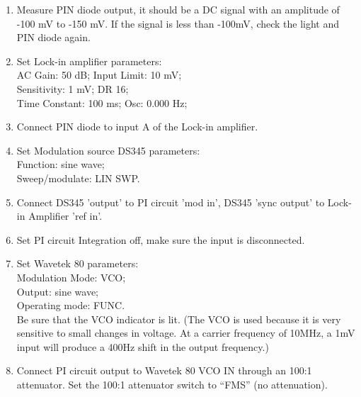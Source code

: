 {\begin{enumerate}
\item Measure PIN diode output, it should be a DC signal with an amplitude
of -100 mV to -150 mV.  If the signal is less than -100mV, check the light and 
PIN diode again.

\item Set Lock-in amplifier parameters:\\
\indent    AC Gain:     50 dB;    \hspace{3.2cm}    Input Limit: 10 mV;\\
\indent    Sensitivity:  1 mV;    \hspace{3cm}    DR 16;\\
\indent    Time Constant: 100 ms; \hspace{2cm}    Osc: 0.000 Hz;\\

\item Connect PIN diode to input A of the Lock-in amplifier.

\item Set Modulation source DS345 parameters:\\
\indent     Function:  sine wave;\\
\indent     Sweep/modulate: LIN SWP.\\

\item Connect DS345 'output' to PI circuit 'mod in', 
DS345 'sync output' to Lock-in Amplifier 'ref in'.

\item Set PI circuit Integration off, make sure the input is disconnected.

\item Set Wavetek 80 parameters:\\
\indent Modulation Mode: \hspace{0.5cm} VCO;\\
\indent Output: \hspace{2.3cm}  sine wave;\\
\indent Operating mode: \hspace{0.8cm}  FUNC.\\

Be sure that the VCO indicator is lit.
(The VCO is used because it is very sensitive to small changes in voltage.  
At a carrier frequency of 10MHz, a 1mV input will produce a 400Hz shift 
in the output frequency.)

\item Connect PI circuit output to Wavetek 80 VCO IN through an 100:1 attenuator. 
       Set the 100:1 attenuator switch to ``FMS'' (no attenuation). 


\end{enumerate}}
